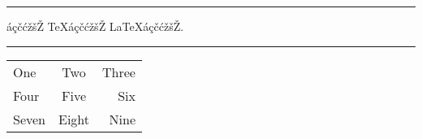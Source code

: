 \documentclass{article}
\begin{document}
\START
\hrule\bigskip

\begin{demohigh}
áçčćžšŽ \TeX áçčćžšŽ \LaTeX áçčćžšŽ.
\end{demohigh}
\ENDTEST

\bigskip\hrule\bigskip

\begin{demohigh*}[language=latex/table,visiblespace]
\begin{tabular}[b]{|lc|r|}
\hline
One   &  Two  & Three \\
Four  & Five  &   Six \\
\hline%
Seven & Eight &  Nine \\
\hline
\end{tabular}
\end{demohigh*}
\ENDTEST
\end{document}
